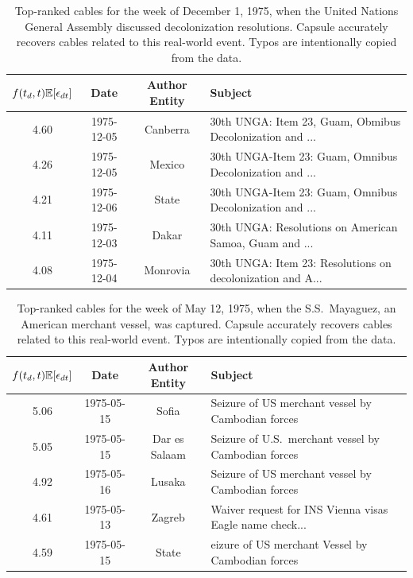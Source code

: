 \begin{table}[tb]
\small
\centering
\begin{tabular}{cccl}
\toprule
$f(t_d, t) \mathbb{E}[\epsilon_{dt}]$ & \textbf{Date} & \textbf{Author Entity} & \textbf{Subject} \\
\midrule
4.60 & 1975-12-05 & Canberra & 30th UNGA: Item 23, Guam, Obmibus Decolonization and ... \\
4.26 & 1975-12-05 & Mexico & 30th UNGA-Item 23: Guam, Omnibus Decolonization and ... \\
4.21 & 1975-12-06 & State & 30th UNGA-Item 23: Guam, Omnibus Decolonization and ... \\
4.11 & 1975-12-03 & Dakar & 30th UNGA: Resolutions on American Samoa, Guam and ...\\
4.08 & 1975-12-04 & Monrovia & 30th UNGA: Item 23: Resolutions on decolonization and A...\\
\bottomrule
\end{tabular}
\caption{Top-ranked cables for the week of December 1, 1975, when the
  United Nations General Assembly discussed decolonization
  resolutions. Capsule accurately recovers cables related to this
  real-world event. Typos are intentionally copied from the data.}
\label{tab:decol}
\end{table}

\begin{table}[ht]
\small
\centering
\begin{tabular}{cccl}
\toprule
$f(t_d, t) \mathbb{E}[\epsilon_{dt}]$ & \textbf{Date} & \textbf{Author Entity} & \textbf{Subject} \\
\midrule
5.06 & 1975-05-15 & Sofia & Seizure of US merchant vessel by Cambodian forces \\
5.05 & 1975-05-15 & Dar es Salaam & Seizure of U.S.~merchant vessel by Cambodian forces \\
4.92 & 1975-05-16 & Lusaka & Seizure of US merchant vessel by Cambodian forces \\
4.61 & 1975-05-13 & Zagreb & Waiver request for INS Vienna visas Eagle name check... \\
4.59 & 1975-05-15 & State & eizure of US merchant Vessel by Cambodian forces \\
\bottomrule
\end{tabular}
\caption{Top-ranked cables for the week of May 12, 1975, when the
  S.S.~Mayaguez, an American merchant vessel, was captured. Capsule
  accurately recovers cables related to this real-world event. Typos
  are intentionally copied from the data.}
\label{tab:mayaguez}
\end{table}

